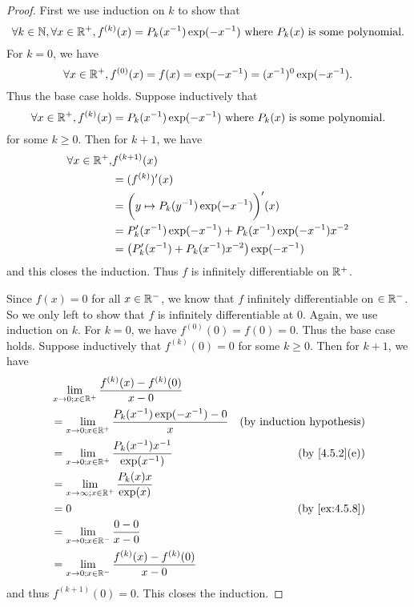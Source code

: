\begin{proof}
  First we use induction on \(k\) to show that
  \[
    \forall k \in \mathbb{N}, \forall x \in \mathbb{R}^+, f^{(k)}(x) = P_k(x^{-1}) \exp(-x^{-1}) \text{ where } P_k(x) \text{ is some polynomial}.
  \]
  For \(k = 0\), we have
  \[
    \forall x \in \mathbb{R}^+, f^{(0)}(x) = f(x) = \exp(-x^{-1}) = (x^{-1})^0 \exp(-x^{-1}).
  \]
  Thus the base case holds.
  Suppose inductively that
  \[
    \forall x \in \mathbb{R}^+, f^{(k)}(x) = P_k(x^{-1}) \exp(-x^{-1}) \text{ where } P_k(x) \text{ is some polynomial}.
  \]
  for some \(k \geq 0\).
  Then for \(k + 1\), we have
  \begin{align*}
    \forall x \in \mathbb{R}^+, & f^{(k + 1)}(x)                                                  \\
                        & = (f^{(k)})'(x)                                                 \\
                        & = \bigg(y \mapsto P_k(y^{-1}) \exp(-x^{-1})\bigg)'(x)           \\
                        & = P_k'(x^{-1}) \exp(-x^{-1}) + P_k(x^{-1}) \exp(-x^{-1}) x^{-2} \\
                        & = \big(P_k'(x^{-1}) + P_k(x^{-1}) x^{-2}\big) \exp(-x^{-1})
  \end{align*}
  and this closes the induction.
  Thus \(f\) is infinitely differentiable on \(\mathbb{R}^+\).

  Since \(f(x) = 0\) for all \(x \in \mathbb{R}^-\), we know that \(f\) infinitely differentiable on \(\in \mathbb{R}^-\).
  So we only left to show that \(f\) is infinitely differentiable at \(0\).
  Again, we use induction on \(k\).
  For \(k = 0\), we have \(f^{(0)}(0) = f(0) = 0\).
  Thus the base case holds.
  Suppose inductively that \(f^{(k)}(0) = 0\) for some \(k \geq 0\).
  Then for \(k + 1\), we have
  \begin{align*}
     & \lim_{x \to 0 ; x \in \R^+} \frac{f^{(k)}(x) - f^{(k)}(0)}{x - 0}                                        \\
     & = \lim_{x \to 0 ; x \in \R^+} \frac{P_k(x^{-1}) \exp(-x^{-1}) - 0}{x} & \text{(by induction hypothesis)} \\
     & = \lim_{x \to 0 ; x \in \R^+} \frac{P_k(x^{-1}) x^{-1}}{\exp(x^{-1})} & \text{(by \cref{4.5.2}(e))}      \\
     & = \lim_{x \to \infty ; x \in \R^+} \frac{P_k(x) x}{\exp(x)}                                              \\
     & = 0                                                                   & \text{(by \cref{ex:4.5.8})}      \\
     & = \lim_{x \to 0 ; x \in \R^-} \frac{0 - 0}{x - 0}                                                        \\
     & = \lim_{x \to 0 ; x \in \R^-} \frac{f^{(k)}(x) - f^{(k)}(0)}{x - 0}
  \end{align*}
  and thus \(f^{(k + 1)}(0) = 0\).
  This closes the induction.


\end{proof}

